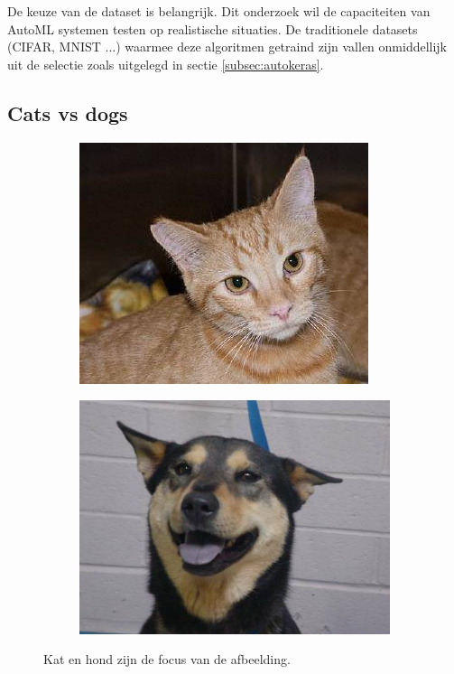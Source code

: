 De keuze van de dataset is belangrijk. Dit onderzoek wil de capaciteiten van AutoML systemen testen op realistische situaties. De traditionele datasets (CIFAR, MNIST ...) waarmee deze algoritmen getraind zijn vallen onmiddellijk uit de selectie zoals uitgelegd in sectie \ref{subsec:autokeras}.

\subsection{Cats vs dogs}
\label{subsec:catsvsdogs}

\begin{figure}
    \begin{subfigure}{.5\textwidth}
        \centering
        \includegraphics[width=.8\linewidth]{img/good_cat.jpg}
        \label{fig:cat-goog}
    \end{subfigure}%
    \begin{subfigure}{.5\textwidth}
        \centering
        \includegraphics[width=.8\linewidth]{img/good_dog.jpg}
        \label{fig:dog-good}
    \end{subfigure}
    \caption{Kat en hond zijn de focus van de afbeelding.}
    \label{fig:catdog-good}
\end{figure}


